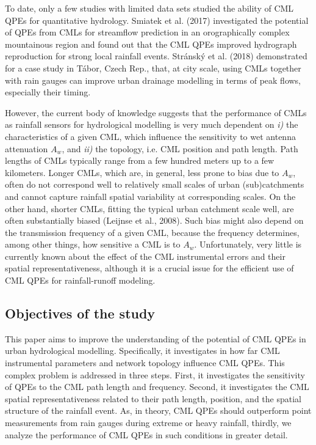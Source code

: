 \documentclass{ctuthesis}\usepackage[]{graphicx}\usepackage[]{color}
\begin{document}
To date, only a few studies with limited data sets studied the ability of CML QPEs for quantitative hydrology. Smiatek et al. (2017) investigated the potential of QPEs from CMLs for streamflow prediction in an orographically complex mountainous region and found out that the CML QPEs improved hydrograph reproduction for strong local rainfall events. Stránský et al. (2018) demonstrated for a case study in Tábor, Czech Rep., that, at city scale, using CMLs together with rain gauges can improve urban drainage modelling in terms of peak flows, especially their timing.

However, the current body of knowledge suggests that the performance of CMLs as rainfall sensors for hydrological modelling is very much dependent on \emph{i)} the characteristics of a given CML, which influence the sensitivity to wet antenna attenuation $A_w$, and \emph{ii)} the topology, i.e. CML position and path length. Path lengths of CMLs typically range from a few hundred meters up to a few kilometers. Longer CMLs, which are, in general, less prone to bias due to $A_w$, often do not correspond well to relatively small scales of urban (sub)catchments and cannot capture rainfall spatial variability at corresponding scales. On the other hand, shorter CMLs, fitting the typical urban catchment scale well, are often substantially biased (Leijnse et al., 2008). Such bias might also depend on the transmission frequency of a given CML, because the frequency determines, among other things, how sensitive a CML is to $A_w$. Unfortunately, very little is currently known about the effect of the CML instrumental errors and their spatial representativeness, although it is a crucial issue for the efficient use of CML QPEs for rainfall-runoff modeling.

\subsection{Objectives of the study}

This paper aims to improve the understanding of the potential of CML QPEs in urban hydrological modelling. Specifically, it investigates in how far CML instrumental parameters and network topology influence CML QPEs. This complex problem is addressed in three steps. First, it investigates the sensitivity of QPEs to the CML path length and frequency. Second, it investigates the CML spatial representativeness related to their path length, position, and the spatial structure of the rainfall event. As, in theory, CML QPEs should outperform point measurements from rain gauges during extreme or heavy rainfall, thirdly, we analyze the performance of CML QPEs in such conditions in greater detail. 
\end{document}
